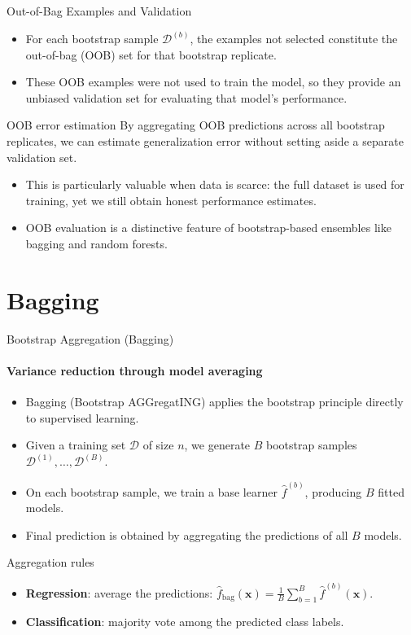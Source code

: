\begin{frame}{Out-of-Bag Examples and Validation}
  \begin{itemize}
    \item For each bootstrap sample $\mathcal{D}^{(b)}$, the examples not selected constitute
          the \alert{out-of-bag (OOB)} set for that bootstrap replicate.
    \item These OOB examples were not used to train the model, so they provide an
          \alert{unbiased validation set} for evaluating that model's performance.
  \end{itemize}
  \begin{block}{OOB error estimation}
    By aggregating OOB predictions across all bootstrap replicates, we can estimate
    generalization error \alert{without setting aside a separate validation set}.
  \end{block}
  \begin{itemize}
    \item This is particularly valuable when data is scarce: the full dataset is used for
          training, yet we still obtain honest performance estimates.
    \item OOB evaluation is a distinctive feature of bootstrap-based ensembles like bagging
          and random forests.
  \end{itemize}
\end{frame}

\section{Bagging}

\begin{frame}{Bootstrap Aggregation (Bagging)}
  \framesubtitle{Variance reduction through model averaging}
  \begin{itemize}
    \item \alert{Bagging} (Bootstrap AGGregatING) applies the bootstrap principle directly
          to supervised learning.
    \item Given a training set $\mathcal{D}$ of size $n$, we generate $B$ bootstrap samples
          $\mathcal{D}^{(1)}, \ldots, \mathcal{D}^{(B)}$.
    \item On each bootstrap sample, we train a \alert{base learner} $\hat{f}^{(b)}$, producing
          $B$ fitted models.
    \item Final prediction is obtained by \alert{aggregating} the predictions of all $B$ models.
  \end{itemize}
  \begin{block}{Aggregation rules}
    \begin{itemize}
      \item \textbf{Regression}: average the predictions:
            $\displaystyle \hat{f}_{\text{bag}}(\mathbf{x}) = \frac{1}{B}\sum_{b=1}^{B} \hat{f}^{(b)}(\mathbf{x})$.
      \item \textbf{Classification}: majority vote among the predicted class labels.
    \end{itemize}
  \end{block}
\end{frame}

